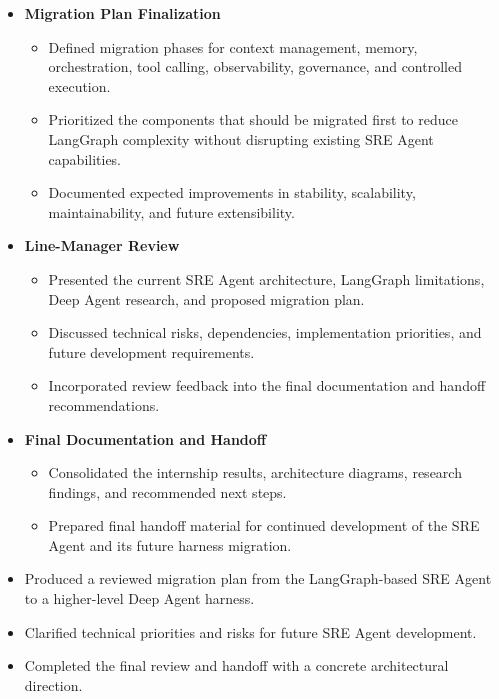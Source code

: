 \begin{itemize}
    \item \textbf{Migration Plan Finalization}
    \begin{itemize}
        \item Defined migration phases for context management, memory, orchestration, tool calling, observability, governance, and controlled execution.
        \item Prioritized the components that should be migrated first to reduce LangGraph complexity without disrupting existing SRE Agent capabilities.
        \item Documented expected improvements in stability, scalability, maintainability, and future extensibility.
    \end{itemize}

    \item \textbf{Line-Manager Review}
    \begin{itemize}
        \item Presented the current SRE Agent architecture, LangGraph limitations, Deep Agent research, and proposed migration plan.
        \item Discussed technical risks, dependencies, implementation priorities, and future development requirements.
        \item Incorporated review feedback into the final documentation and handoff recommendations.
    \end{itemize}

    \item \textbf{Final Documentation and Handoff}
    \begin{itemize}
        \item Consolidated the internship results, architecture diagrams, research findings, and recommended next steps.
        \item Prepared final handoff material for continued development of the SRE Agent and its future harness migration.
    \end{itemize}
\end{itemize}


\begin{itemize}
    \item Produced a reviewed migration plan from the LangGraph-based SRE Agent to a higher-level Deep Agent harness.
    \item Clarified technical priorities and risks for future SRE Agent development.
    \item Completed the final review and handoff with a concrete architectural direction.
\end{itemize}
